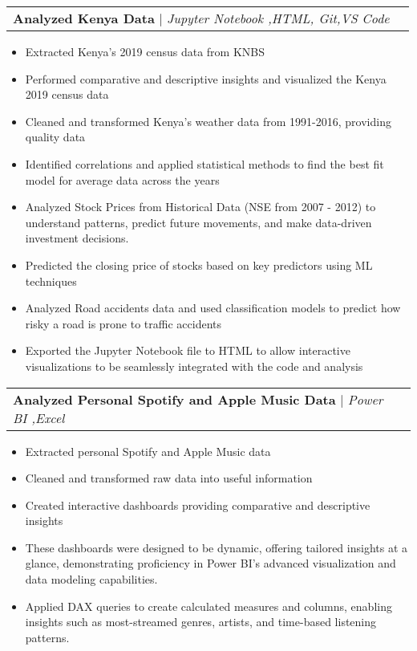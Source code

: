 \documentclass[letterpaper,11pt]{article}
\makeatletter
\newcommand{\resumeItem}[1]{
  \item\small{
    {#1 \vspace{-2pt}}
  }
}
\newcommand{\resumeProjectHeading}[2]{
    \item
    \begin{tabular*}{0.97\textwidth}{l@{\extracolsep{\fill}}r}
      \small#1 & #2 \\
    \end{tabular*}\vspace{-7pt}
}
\newcommand{\resumeItemListStart}{\begin{itemize}}
\newcommand{\resumeItemListEnd}{\end{itemize}\vspace{-5pt}}
\makeatother
\begin{document}
        \resumeProjectHeading
        {\textbf{Analyzed Kenya Data} $|$ \footnotesize\emph{ Jupyter Notebook ,HTML, Git,VS Code}}{}
        \resumeItemListStart
            \resumeItem{Extracted Kenya's 2019 census data from KNBS}
            \resumeItem{Performed comparative and descriptive insights and visualized the Kenya 2019 census data}
            \resumeItem{Cleaned and transformed Kenya's weather data from 1991-2016, providing quality data}
            \resumeItem{Identified correlations and applied statistical methods to find the best fit model for average data across the years}
            \resumeItem{Analyzed Stock Prices from Historical Data (NSE from 2007 - 2012) to understand patterns, predict future movements, and make data-driven investment decisions.}
            \resumeItem{Predicted the closing price of stocks based on key predictors using ML techniques}
            \resumeItem{Analyzed Road accidents data and used classification models to predict how risky a road is prone to traffic accidents}
            
            \resumeItem{Exported the Jupyter Notebook file to HTML to allow interactive visualizations to be seamlessly integrated with the code and analysis}
          \resumeItemListEnd
          
          
        \resumeProjectHeading
        {\textbf{Analyzed Personal Spotify and Apple Music Data} $|$ \footnotesize\emph{ Power BI ,Excel}}{}
        \resumeItemListStart
            \resumeItem{Extracted personal Spotify and Apple Music data}
            \resumeItem{Cleaned and transformed raw data into useful information}
            \resumeItem{Created interactive dashboards providing comparative and descriptive insights}
            \resumeItem{These dashboards were designed to be dynamic, offering tailored insights at a glance, demonstrating proficiency in Power BI's advanced visualization and data modeling capabilities.}
            \resumeItem{Applied DAX queries to create calculated measures and columns, enabling insights such as most-streamed genres, artists, and time-based listening patterns.}            
          \resumeItemListEnd
        
        

       
 
 
 
 
 
 

 
 

 
        
\end{document}
